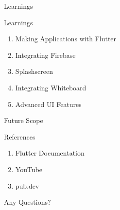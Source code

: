 \documentclass[14pt]{beamer}
\begin{document}
\begin{frame}[standout]
    \alert{Learnings}
\end{frame}

\begin{frame}{Learnings}
    \begin{enumerate}
    \pause
        \item Making Applications with Flutter 
    \pause
        \item Integrating Firebase
    \pause
        \item Splashscreen
    \pause
        \item Integrating Whiteboard
    \pause
        \item Advanced UI Features
    \end{enumerate}
\end{frame}


\begin{frame}[standout]
   Future Scope 
\end{frame}


\begin{frame}{References}
    \begin{enumerate}
        \item Flutter Documentation
        \item YouTube
        \item pub.dev
    \end{enumerate}
\end{frame}


\begin{frame}[standout]
    \alert{Any Questions?}
\end{frame}
\end{document}
